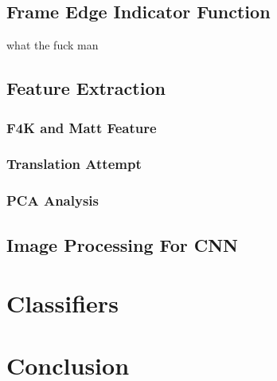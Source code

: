 \documentclass[bsc,logo,twoside,fullspacing,parskip]{infthesis}
\begin{document}
\newpage

\section{Frame Edge Indicator Function}

what the fuck man

\section{Feature Extraction}

\subsection{F4K and Matt Feature}

\subsection{Translation Attempt}

\subsection{PCA Analysis}

\section{Image Processing For CNN}


\chapter{Classifiers}

\chapter{Conclusion}




\end{document}
